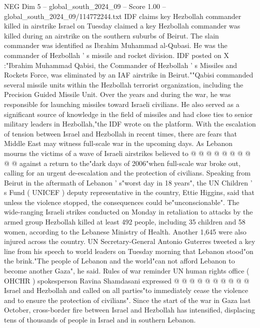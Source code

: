 \begin{textsample}{NEG Dim 5 – global\_south\_2024\_09 – Score 1.00 – global\_south\_2024\_09/114772244.txt}  \label{ex:f5_neg_224}
IDF claims key Hezbollah commander killed in airstrike Israel on Tuesday claimed a key Hezbollah commander was killed during an airstrike on the southern suburbs of Beirut.
The slain commander was identified as Ibrahim Muhammad al-Qubasi.
He was the commander of Hezbollah ' s missile and rocket division.
IDF posted on X :"Ibrahim Muhammad Qabisi, the Commander of Hezbollah ' s Missiles and Rockets Force, was eliminated by an IAF airstrike in Beirut.""Qabisi commanded several missile units within the Hezbollah terrorist organization, including the Precision Guided Missile Unit.
Over the years and during the war, he was responsible for launching missiles toward Israeli civilians.
He also served as a significant source of knowledge in the field of missiles and had close ties to senior military leaders in Hezbollah,"the IDF wrote on the platform.
With the escalation of tension between Israel and Hezbollah in recent times, there are fears that Middle East may witness full-scale war in the upcoming days.
As Lebanon mourns the victims of a wave of Israeli airstrikes believed to @ @ @ @ @ @ @ @ @ @ against a return to the"dark days of 2006"when full-scale war broke out, calling for an urgent de-escalation and the protection of civilians.
Speaking from Beirut in the aftermath of Lebanon ' s"worst day in 18 years", the UN Children ' s Fund ( UNICEF ) deputy representative in the country, Ettie Higgins, said that unless the violence stopped, the consequences could be"unconscionable".
The wide-ranging Israeli strikes conducted on Monday in retaliation to attacks by the armed group Hezbollah killed at least 492 people, including 35 children and 58 women, according to the Lebanese Ministry of Health.
Another 1,645 were also injured across the country.
UN Secretary-General Antonio Guterres tweeted a key line from his speech to world leaders on Tuesday morning that Lebanon stood"on the brink."The people of Lebanon and the world"can not afford Lebanon to become another Gaza", he said.
Rules of war reminder UN human rights office ( OHCHR ) spokesperson Ravina Shamdasani expressed @ @ @ @ @ @ @ @ @ @ Israel and Hezbollah and called on all parties"to immediately cease the violence and to ensure the protection of civilians".
Since the start of the war in Gaza last October, cross-border fire between Israel and Hezbollah has intensified, displacing tens of thousands of people in Israel and in southern Lebanon.

\end{textsample}
